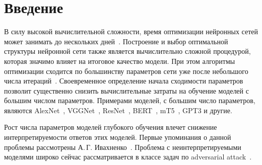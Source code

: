 \newpage


\section{Введение}
В силу высокой вычислительной сложности, время оптимизации нейронных сетей может занимать до нескольких дней~\cite{sutskever2014}.
Построение и выбор оптимальной структуры нейронной сети также является вычислительно сложной процедурой, которая значимо влияет на итоговое качество модели. 
При этом алгоритмы оптимизации сходится по большинству параметров сети уже после небольшого числа итераций~\cite{Chunyan2016}.
Своевременное определение начала сходимости параметров позволит существенно снизить вычислительные затраты на обучение моделей с большим числом параметров.
Примерами моделей, с большим число параметров, являются AlexNet~\cite{Krizhevsky2012}, VGGNet~\cite{Simonyan2014}, ResNet~\cite{Kaiming2015}, BERT~\cite{Devlin2018, Vaswani2017}, mT5~\cite{Linting2021}, GPT3\cite{Brown2020} и другие.

Рост числа параметров моделей глубокого обучения влечет снижение интерпретируемости ответов этих моделей.
Первые упоминания о данной проблемы рассмотрены А.\,Г. Ивахненко~\cite{Ivakhnenko1994}.
Проблема с неинтерпретируемыми моделями широко сейчас рассматривается в классе задач по adversarial attack~\cite{Zheng2020}.

